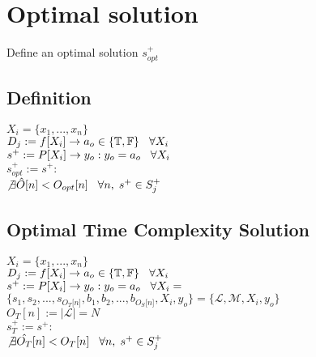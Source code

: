 \documentclass[11pt]{article}
\begin{document}
\section{Optimal solution}
Define an optimal solution $s_{opt}^+$

\subsection{Definition}
\begin{center}
$
X_i = \{x_1,...,x_n\}
$
\\ \vspace{2mm}
$
D_j := f \lbrack X_i \rbrack \rightarrow a_{o} \in \{\mathbb{T}, \mathbb{F}\} \hspace{3mm} \forall X_i
$
\\ \vspace{2mm}
$
s^+ := P \lbrack X_i \rbrack \rightarrow y_{o} : y_o = a_{o} \hspace{3mm} \forall X_i
$
\\ \vspace{2mm}
$
s_{opt}^+ := s^+ :
$
\\ \vspace{2mm}
$
\not \exists \hat{O} \lbrack n \rbrack < O_{opt}[n] \hspace{3mm} \forall n, \hspace{1mm}  s^+ \in S_j^+
$
\end{center}





\subsection{Optimal Time Complexity Solution}
\begin{center}
$
X_i = \{x_1,...,x_n\}
$
\\ \vspace{2mm}
$
D_j := f \lbrack X_i \rbrack \rightarrow a_{o} \in \{\mathbb{T}, \mathbb{F}\} \hspace{3mm} \forall X_i
$
\\ \vspace{2mm}
$
s^+ := P \lbrack X_i \rbrack \rightarrow y_{o} : y_o = a_{o} \hspace{3mm} \forall X_i = 
$
\\ \vspace{2mm}
$
\{ s_1,s_2,...,s_{O_T \lbrack n \rbrack }, b_1, b_2,...,b_{O_S \lbrack n \rbrack},X_i,y_o \} = \{ \mathcal{L},\mathcal{M},X_i,y_o\}
$
\\ \vspace{3mm}
$
O_T[n] := |\mathcal{L}| = N
$
\\ \vspace{2mm}
$
s_{T}^+ := s^+ :
$
\\ \vspace{2mm}
$
\not \exists \hat{O_T} \lbrack n \rbrack < O_{T}[n] \hspace{3mm} \forall n, \hspace{1mm}  s^+ \in S_j^+
$
\end{center}
\end{document}
